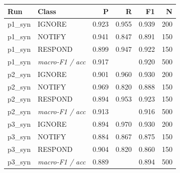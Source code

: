 \begin{tabular}{llrrrr}
\toprule
Run & Class & P & R & F1 & N \\
\midrule
p1_syn & IGNORE & 0.923 & 0.955 & 0.939 & 200 \\
p1_syn & NOTIFY & 0.941 & 0.847 & 0.891 & 150 \\
p1_syn & RESPOND & 0.899 & 0.947 & 0.922 & 150 \\
p1_syn & \textit{macro-F1 / acc} & 0.917 &  & 0.920 & 500 \\
p2_syn & IGNORE & 0.901 & 0.960 & 0.930 & 200 \\
p2_syn & NOTIFY & 0.969 & 0.820 & 0.888 & 150 \\
p2_syn & RESPOND & 0.894 & 0.953 & 0.923 & 150 \\
p2_syn & \textit{macro-F1 / acc} & 0.913 &  & 0.916 & 500 \\
p3_syn & IGNORE & 0.894 & 0.970 & 0.930 & 200 \\
p3_syn & NOTIFY & 0.884 & 0.867 & 0.875 & 150 \\
p3_syn & RESPOND & 0.904 & 0.820 & 0.860 & 150 \\
p3_syn & \textit{macro-F1 / acc} & 0.889 &  & 0.894 & 500 \\
\bottomrule
\end{tabular}
